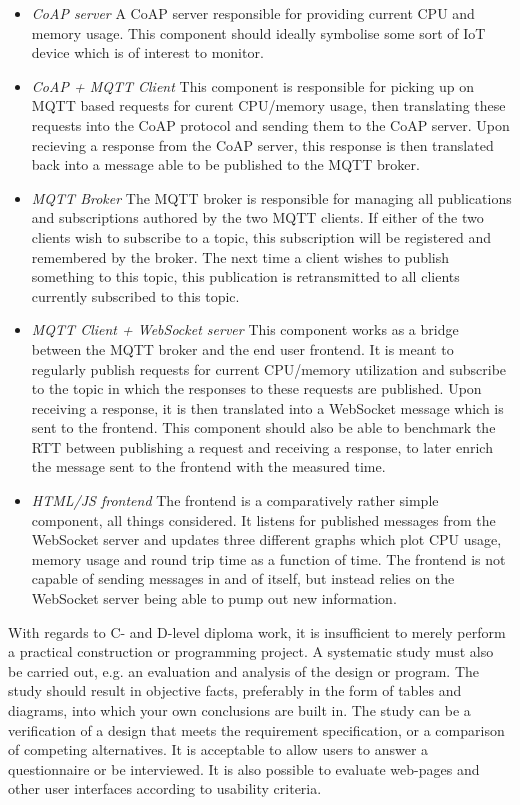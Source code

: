 \begin{itemize}
	\item \textit{CoAP server} A CoAP server responsible for providing current CPU and memory usage. This component should ideally symbolise some sort of IoT device which is of interest to monitor.
	\item \textit{CoAP + MQTT Client} This component is responsible for picking up on MQTT based requests for curent CPU/memory usage, then translating these requests into the CoAP protocol and sending them to the CoAP server. Upon recieving a response from the CoAP server, this response is then translated back into a message able to be published to the MQTT broker.
	\item \textit{MQTT Broker} The MQTT broker is responsible for managing all publications and subscriptions authored by the two MQTT clients. If either of the two clients wish to subscribe to a topic, this subscription will be registered and remembered by the broker. The next time a client wishes to publish something to this topic, this publication is retransmitted to all clients currently subscribed to this topic.
	\item \textit{MQTT Client + WebSocket server} This component works as a bridge between the MQTT broker and the end user frontend. It is meant to regularly publish requests for current CPU/memory utilization and subscribe to the topic in which the responses to these requests are published. Upon receiving a response, it is then translated into a WebSocket message which is sent to the frontend. This component should also be able to benchmark the RTT between publishing a request and receiving a response, to later enrich the message sent to the frontend with the measured time.
	\item \textit{HTML/JS frontend} The frontend is a comparatively rather simple component, all things considered. It listens for published messages from the WebSocket server and updates three different graphs which plot CPU usage, memory usage and round trip time as a function of time. The frontend is not capable of sending messages in and of itself, but instead relies on the WebSocket server being able to pump out new information.
\end{itemize}

\iffalse
With regards to C- and D-level diploma work, it is insufficient to merely perform a practical construction or programming project. A systematic study must also be carried out, e.g. an evaluation and analysis of the design or program. The study should result in objective facts, preferably in the form of tables and diagrams, into which your own conclusions are built in. The study can be a verification of a design that meets the requirement specification, or a comparison of competing alternatives. It is acceptable to allow users to answer a questionnaire or be interviewed. It is also possible to evaluate web-pages and other user interfaces according to usability criteria.


